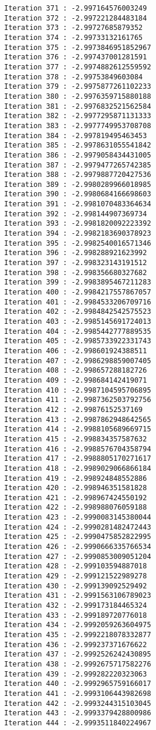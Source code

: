 \documentclass[11pt]{article}
\begin{document}
\begin{Verbatim}[commandchars=\\\{\}]
Iteration 371 : -2.997164576003249
Iteration 372 : -2.997221284483184
Iteration 373 : -2.99727685879352
Iteration 374 : -2.99733132161765
Iteration 375 : -2.9973846951852967
Iteration 376 : -2.997437001281591
Iteration 377 : -2.9974882612559592
Iteration 378 : -2.99753849603084
Iteration 379 : -2.9975877261102233
Iteration 380 : -2.9976359715880188
Iteration 381 : -2.9976832521562584
Iteration 382 : -2.9977295871131333
Iteration 383 : -2.9977749953708708
Iteration 384 : -2.997819495463453
Iteration 385 : -2.9978631055541842
Iteration 386 : -2.9979058434431005
Iteration 387 : -2.9979477265742385
Iteration 388 : -2.9979887720427536
Iteration 389 : -2.9980289966018985
Iteration 390 : -2.9980684166698603
Iteration 391 : -2.9981070483364634
Iteration 392 : -2.998144907369734
Iteration 393 : -2.9981820092223392
Iteration 394 : -2.9982183690378923
Iteration 395 : -2.9982540016571346
Iteration 396 : -2.998288921623992
Iteration 397 : -2.998323143191512
Iteration 398 : -2.998356680327682
Iteration 399 : -2.9983895467211283
Iteration 400 : -2.9984217557867057
Iteration 401 : -2.9984533206709716
Iteration 402 : -2.9984842542575523
Iteration 403 : -2.9985145691724013
Iteration 404 : -2.9985442777889535
Iteration 405 : -2.9985733922331743
Iteration 406 : -2.998601924388511
Iteration 407 : -2.9986298859007405
Iteration 408 : -2.998657288182726
Iteration 409 : -2.998684142419071
Iteration 410 : -2.9987104595706895
Iteration 411 : -2.9987362503792756
Iteration 412 : -2.99876152537169
Iteration 413 : -2.9987862948642565
Iteration 414 : -2.9988105689669715
Iteration 415 : -2.998834357587632
Iteration 416 : -2.9988576704358794
Iteration 417 : -2.9988805170271617
Iteration 418 : -2.9989029066866184
Iteration 419 : -2.998924848552886
Iteration 420 : -2.998946351581828
Iteration 421 : -2.998967424550192
Iteration 422 : -2.998988076059188
Iteration 423 : -2.9990083145380044
Iteration 424 : -2.9990281482472443
Iteration 425 : -2.9990475852822995
Iteration 426 : -2.9990666335766534
Iteration 427 : -2.9990853009051204
Iteration 428 : -2.999103594887018
Iteration 429 : -2.999121522989278
Iteration 430 : -2.999139092529492
Iteration 431 : -2.9991563106789023
Iteration 432 : -2.999173184465324
Iteration 433 : -2.999189720776018
Iteration 434 : -2.9992059263604975
Iteration 435 : -2.9992218078332877
Iteration 436 : -2.999237371676622
Iteration 437 : -2.9992526242430895
Iteration 438 : -2.9992675717582276
Iteration 439 : -2.999282220323063
Iteration 440 : -2.9992965759166017
Iteration 441 : -2.9993106443982698
Iteration 442 : -2.9993244315103045
Iteration 443 : -2.9993379428800986
Iteration 444 : -2.9993511840224967

\end{Verbatim}
\end{document}
